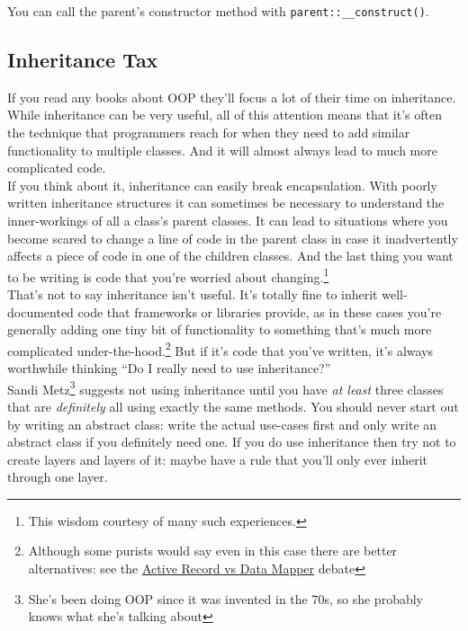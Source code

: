 
You can call the parent's constructor method with \texttt{parent::\_\_construct()}.



\subsection{Inheritance Tax}


If you read any books about OOP they'll focus a lot of their time on inheritance. While inheritance can be very useful, all of this attention means that it's often the technique that programmers reach for when they need to add similar functionality to multiple classes. And it will almost always lead to much more complicated code.
\\

If you think about it, inheritance can easily break encapsulation. With poorly written inheritance structures it can sometimes be necessary to understand the inner-workings of all a class's parent classes. It can lead to situations where you become scared to change a line of code in the parent class in case it inadvertently affects a piece of code in one of the children classes. And the last thing you want to be writing is code that you're worried about changing.\footnote{This wisdom courtesy of many such experiences.}
\\

That's not to say inheritance isn't useful. It's totally fine to inherit well-documented code that frameworks or libraries provide, as in these cases you're generally adding one tiny bit of functionality to something that's much more complicated under-the-hood.\footnote{Although some purists would say even in this case there are better alternatives: see the \href{https://www.thoughtfulcode.com/orm-active-record-vs-data-mapper/}{Active Record vs Data Mapper} debate} But if it's code that you've written, it's always worthwhile thinking ``Do I really need to use inheritance?''
\\

Sandi Metz\footnote{She's been doing OOP since it was invented in the 70s, so she probably knows what she's talking about} suggests not using inheritance until you have \textit{at least} three classes that are \textit{definitely} all using exactly the same methods. You should never start out by writing an abstract class: write the actual use-cases first and only write an abstract class if you definitely need one. If you do use inheritance then try not to create layers and layers of it: maybe have a rule that you'll only ever inherit through one layer.


